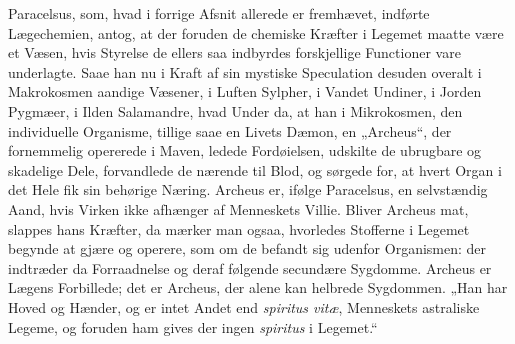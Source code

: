 \documentclass[12pt,a4paper]{book}
\begin{document}
\setcounter{footnote}{0}
Paracelsus, som, hvad i forrige Afsnit allerede er fremhævet,
indførte Lægechemien, antog, at der foruden de chemiske Kræfter i
Legemet maatte være et Væsen, hvis Styrelse de ellers saa indbyrdes
forskjellige Functioner vare underlagte. Saae han nu i Kraft af sin
mystiske Speculation desuden overalt i Makrokosmen aandige Væsener,
i Luften Sylpher, i Vandet Undiner, i Jorden Pygmæer, i Ilden
Salamandre, hvad Under da, at han i Mikrokosmen, den individuelle
Organisme, tillige saae en Livets Dæmon, en „Archeus“, der
fornemmelig opererede i Maven, ledede Fordøielsen, udskilte de
ubrugbare og skadelige Dele, forvandlede de nærende til Blod, og
sørgede for, at hvert Organ i det Hele fik sin behørige Næring.
Archeus er, ifølge Paracelsus, en selvstændig Aand, hvis Virken ikke
afhænger af Menneskets Villie. Bliver Archeus mat, slappes hans
Kræfter, da mærker man
ogsaa, hvorledes Stofferne i Legemet begynde at gjære og operere, som
om de befandt sig udenfor Organismen: der indtræder da Forraadnelse
og deraf følgende secundære Sygdomme. Archeus er Lægens Forbillede;
det er Archeus, der alene kan helbrede Sygdommen. „Han har Hoved og
Hænder, og er intet Andet end \textit{spiritus vitæ}, Menneskets
astraliske Legeme, og foruden ham gives der ingen \textit{spiritus} i
Legemet.“
\end{document}

